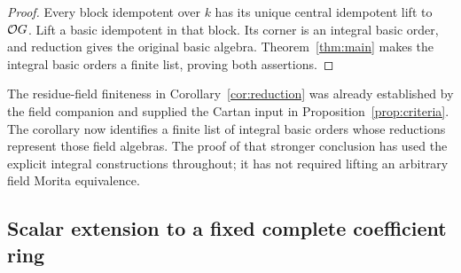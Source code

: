 \begin{proof}
Every block idempotent over $k$ has its unique central
idempotent lift to $\mathcal O G$.  Lift a basic idempotent in
that block.  Its corner is an integral basic order, and
reduction gives the original basic algebra.  Theorem~\ref{thm:main}
makes the integral basic orders a finite list, proving
both assertions.
\end{proof}

The residue-field finiteness in Corollary~\ref{cor:reduction} was
already established by the field companion and supplied the Cartan
input in Proposition~\ref{prop:criteria}.  The corollary now identifies
a finite list of integral basic orders whose reductions represent
those field algebras.  The proof of that stronger conclusion has used
the explicit integral constructions throughout; it has not required
lifting an arbitrary field Morita equivalence.

\subsection{Scalar extension to a fixed complete coefficient ring}

